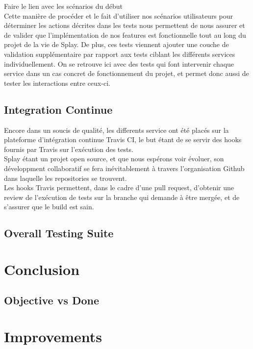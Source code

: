 \documentclass{eplmastersthesis}
\begin{document}
      {\color{red} Faire le lien avec les scénarios du début}\\

      Cette manière de procéder et le fait d'utiliser nos scénarios utilisateurs
      pour déterminer les actions décrites dans les tests nous permettent de
      nous assurer et de valider que l'implémentation de nos features est
      fonctionnelle tout au long du projet de la vie de Splay. De plus, ces
      tests viennent ajouter une couche de validation supplémentaire par rapport
      aux tests ciblant les différents services individuellement. On se retrouve
      ici avec des tests qui font intervenir chaque service dans un cas concret
      de fonctionnement du projet, et permet donc aussi de tester les interactions
      entre ceux-ci.


    \section{Integration Continue}

      Encore dans un soucis de qualité, les differents service ont été placés
      sur la plateforme d'intégration continue Travis CI, le but étant de se
      servir des hooks fournis par Travis sur l'exécution des tests.\\

      Splay étant un projet open source, et que nous espérons voir évoluer, son
      développment collaboratif se fera inévitablement à travers l'organisation
      Github dans laquelle les repositories se trouvent.\\
      Les hooks Travis permettent, dans le cadre d'une pull request, d'obtenir
      une review de l'exécution de tests sur la branche qui demande à être
      mergée, et de s'assurer que le build est sain.

    \section{Overall Testing Suite}


  \chapter{Conclusion}

    \section{Objective vs Done}

    \section{}

  \chapter{Improvements}


  \nocite{*}
  
  




  \backcoverpage
\end{document}
